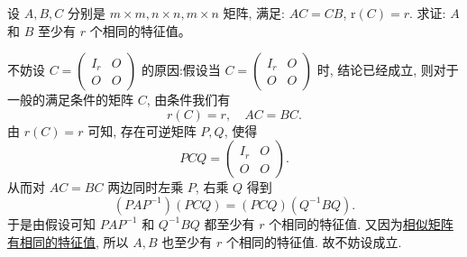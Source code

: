 \documentclass[../../main.tex]{subfiles}%
\begin{document}
\begin{proposition}\label{proposition:AC=CB则A,B至少有r个相同特征值}
设 $A, B, C$ 分别是 $m \times m, n \times n, m \times n$ 矩阵, 满足: $AC = CB$, $\mathrm{r}(C) = r$. 求证: $A$ 和 $B$ 至少有 $r$ 个相同的特征值。
\end{proposition}
\begin{remark}
不妨设 $C = \begin{pmatrix}
I_r & O \\
O & O
\end{pmatrix}$ 的原因:假设当 $C = \begin{pmatrix}
I_r & O \\
O & O
\end{pmatrix}$ 时, 结论已经成立, 则对于一般的满足条件的矩阵 $C$, 由条件我们有
\[
r(C) = r, \quad AC = BC.
\]
由 $r(C) = r$ 可知, 存在可逆矩阵 $P, Q$, 使得
\[
PCQ = \begin{pmatrix}
I_r & O \\
O & O
\end{pmatrix}.
\]
从而对 $AC = BC$ 两边同时左乘 $P$, 右乘 $Q$ 得到
\[
(PAP^{-1})(PCQ) = (PCQ)(Q^{-1}BQ).
\]
于是由假设可知 $PAP^{-1}$ 和 $Q^{-1}BQ$ 都至少有 $r$ 个相同的特征值. 又因为\hyperref[theorem:相似矩阵有相同的特征多项式与特征值]{相似矩阵有相同的特征值}, 所以 $A, B$ 也至少有 $r$ 个相同的特征值. 故不妨设成立.
\end{remark}
\end{document}
